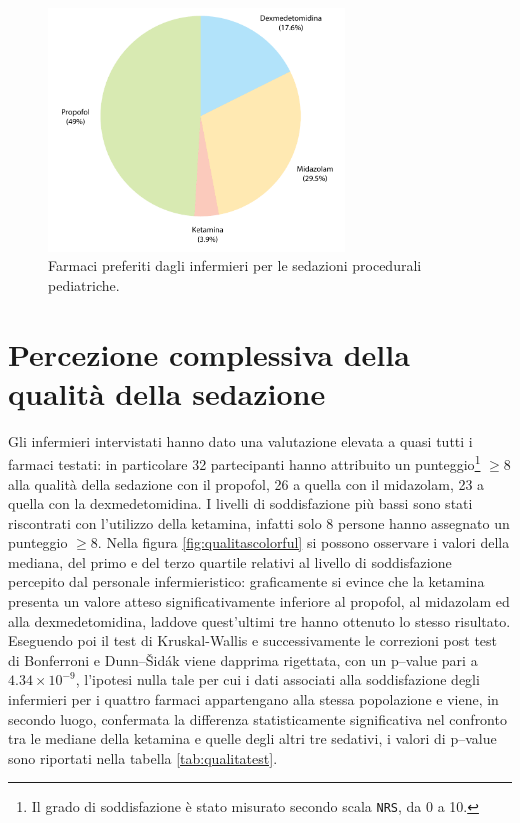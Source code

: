 \begin{figure}[!ht]
    \centering
    \includegraphics[width=0.7\textwidth]{Figure/preferenze.pdf}
    \caption{Farmaci preferiti dagli infermieri per le sedazioni procedurali pediatriche.}
    \label{fig:preferenze}
\end{figure}



\section{Percezione complessiva della qualità della sedazione}
Gli infermieri intervistati hanno dato una valutazione elevata a quasi tutti i farmaci testati: in particolare 32 partecipanti hanno attribuito un punteggio\footnote{Il grado di soddisfazione è stato misurato secondo scala \texttt{NRS}, da 0 a 10.} $\geq8$ alla qualità della sedazione con il propofol, 26 a quella con il midazolam, 23 a quella con la dexmedetomidina. I livelli di soddisfazione più bassi sono stati riscontrati con l'utilizzo della ketamina, infatti solo 8 persone hanno assegnato un punteggio $\geq8$. Nella figura \ref{fig:qualitascolorful} si possono osservare i valori della mediana, del primo e del terzo quartile relativi al livello di soddisfazione percepito dal personale infermieristico: graficamente si evince che la ketamina presenta un valore atteso significativamente inferiore al propofol, al midazolam ed alla dexmedetomidina, laddove quest'ultimi tre hanno ottenuto lo stesso risultato. Eseguendo poi il test di Kruskal-Wallis e successivamente le correzioni post test di Bonferroni e Dunn--Šidák viene dapprima rigettata, con un p--value pari a $4.34\times10^{-9}$, l'ipotesi nulla tale per cui i dati associati alla soddisfazione degli infermieri per i quattro farmaci appartengano alla stessa popolazione e viene, in secondo luogo, confermata la differenza statisticamente significativa nel confronto tra le mediane della ketamina e quelle degli altri tre sedativi, i valori di p--value sono riportati nella tabella \ref{tab:qualitatest}. 

